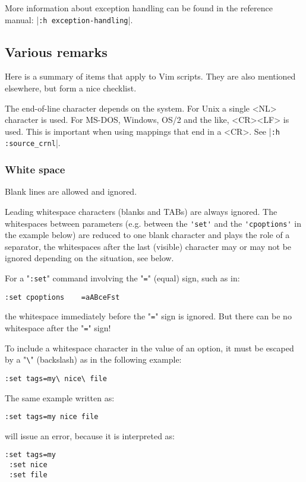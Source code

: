 More information about exception handling can be found in the reference manual: |\verb!:h exception-handling!|.
\subsection{Various remarks}
Here is a summary of items that apply to Vim scripts.
They are also mentioned elsewhere, but form a nice checklist.

The end-of-line character depends on the system.
For Unix a single <NL> character is used.
For MS-DOS, Windows, OS/2 and the like, <CR><LF> is used.
This is important when using mappings that end in a <CR>.
See |\verb!:h :source_crnl!|.
\subsubsection{White space}
Blank lines are allowed and ignored.

Leading whitespace characters (blanks and TABs) are always ignored.
The whitespaces between parameters (e.g. between the \verb!'set'! and the \verb!'cpoptions'! in the example below) are reduced to one blank character and plays the role of a separator, the whitespaces after the last (visible) character may or may not be ignored depending on the situation, see below.

For a "\verb!:set!" command involving the "\verb!=!" (equal) sign, such as in:

\begin{Verbatim}[samepage=true]
 :set cpoptions    =aABceFst
\end{Verbatim}

the whitespace immediately before the "\verb!=!" sign is ignored.
But there can be no whitespace after the "\verb!=!" sign!

To include a whitespace character in the value of an option, it must be escaped by a "\verb!\!" (backslash)  as in the following example:

\begin{Verbatim}[samepage=true]
 :set tags=my\ nice\ file
\end{Verbatim}

The same example written as:

\begin{Verbatim}[samepage=true]
 :set tags=my nice file
\end{Verbatim}

will issue an error, because it is interpreted as:

\begin{Verbatim}[samepage=true]
 :set tags=my
 :set nice
 :set file
\end{Verbatim}

